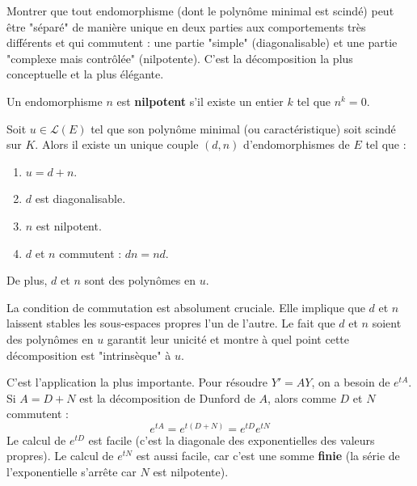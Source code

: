 \begin{objectif}
    Montrer que tout endomorphisme (dont le polynôme minimal est scindé) peut être "séparé" de manière unique en deux parties aux comportements très différents et qui commutent : une partie "simple" (diagonalisable) et une partie "complexe mais contrôlée" (nilpotente). C'est la décomposition la plus conceptuelle et la plus élégante.
\end{objectif}

\begin{definition}
    Un endomorphisme $n$ est \textbf{nilpotent} s'il existe un entier $k$ tel que $n^k=0$.
\end{definition}

\begin{theorem}
    Soit $u \in \mathcal{L}(E)$ tel que son polynôme minimal (ou caractéristique) soit scindé sur $K$. Alors il existe un unique couple $(d,n)$ d'endomorphismes de $E$ tel que :
    \begin{enumerate}
        \item $u = d + n$.
        \item $d$ est diagonalisable.
        \item $n$ est nilpotent.
        \item $d$ et $n$ commutent : $dn = nd$.
    \end{enumerate}
    De plus, $d$ et $n$ sont des polynômes en $u$.
\end{theorem}

\begin{remark}
    La condition de commutation est absolument cruciale. Elle implique que $d$ et $n$ laissent stables les sous-espaces propres l'un de l'autre. Le fait que $d$ et $n$ soient des polynômes en $u$ garantit leur unicité et montre à quel point cette décomposition est "intrinsèque" à $u$.
\end{remark}

\begin{application}
    C'est l'application la plus importante. Pour résoudre $Y'=AY$, on a besoin de $e^{tA}$. Si $A=D+N$ est la décomposition de Dunford de $A$, alors comme $D$ et $N$ commutent :
    $$ e^{tA} = e^{t(D+N)} = e^{tD} e^{tN} $$
    Le calcul de $e^{tD}$ est facile (c'est la diagonale des exponentielles des valeurs propres).
    Le calcul de $e^{tN}$ est aussi facile, car c'est une somme \textbf{finie} (la série de l'exponentielle s'arrête car $N$ est nilpotente).
\end{application}

